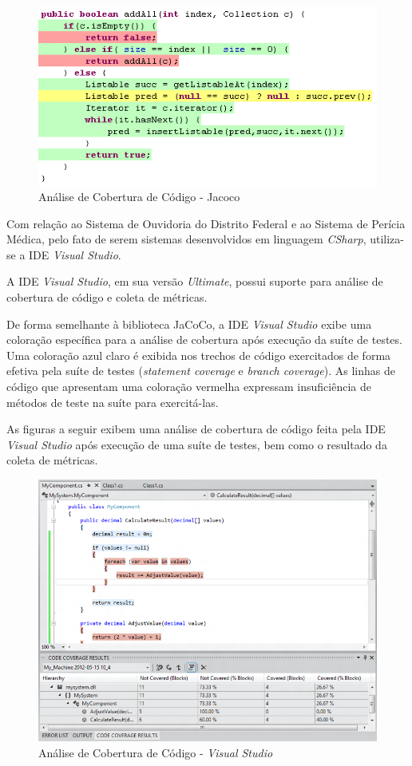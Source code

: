 \begin{figure}[!h]
\includegraphics[width=\textwidth]{figuras/jacoco.png}
\caption{Análise de Cobertura de Código - Jacoco}
\end{figure}

Com relação ao Sistema de Ouvidoria do Distrito Federal e ao Sistema de Perícia Médica, pelo fato de serem sistemas desenvolvidos em linguagem \textit{CSharp}, utiliza-se a IDE \textit{Visual Studio}.

A IDE \textit{Visual Studio}, em sua versão \textit{Ultimate}, possui suporte para análise de cobertura de código e coleta de métricas.

De forma semelhante à biblioteca JaCoCo, a IDE \textit{Visual Studio} exibe uma coloração específica para a análise de cobertura após execução da suíte de testes. Uma coloração azul claro é exibida nos trechos de código exercitados de forma efetiva pela suíte de testes (\textit{statement coverage} e \textit{branch coverage}). As linhas de código que apresentam uma coloração vermelha expressam insuficiência de métodos de teste na suíte para exercitá-las.

As figuras a seguir exibem uma análise de cobertura de código feita pela IDE \textit{Visual Studio} após execução de uma suíte de testes, bem como o resultado da coleta de métricas.

\begin{figure}[!h]
\includegraphics[width=\textwidth]{figuras/codeCoverageVS.png}
\caption{Análise de Cobertura de Código - \textit{Visual Studio}}
\end{figure}

